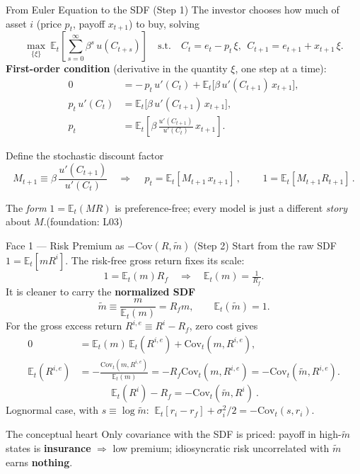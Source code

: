 \documentclass{beamer}
\newcommand{\E}{\mathbb{E}}
\newcommand{\Cov}{\mathrm{Cov}}
\begin{document}
\begin{frame}{From Euler Equation to the SDF (Step 1)}
\small
The investor chooses how much of asset $i$ (price $p_t$, payoff $x_{t+1}$) to buy, solving
\begin{equation*}
\max_{\{\xi\}}\ \E_t\!\left[\sum_{s=0}^{\infty}\beta^{s}\, u(C_{t+s})\right]
\quad\text{s.t.}\quad C_t = e_t - p_t\,\xi,\ \ C_{t+1}=e_{t+1}+x_{t+1}\,\xi .
\end{equation*}
\textbf{First-order condition} (derivative in the quantity $\xi$, one step at a time):
\begin{align*}
0 &= -\,p_t\, u'(C_t) + \E_t\!\big[\beta\, u'(C_{t+1})\, x_{t+1}\big],\\
p_t\, u'(C_t) &= \E_t\!\big[\beta\, u'(C_{t+1})\, x_{t+1}\big],\\
p_t &= \E_t\!\left[\beta\,\frac{u'(C_{t+1})}{u'(C_t)}\,x_{t+1}\right].
\end{align*}
\begin{block}{Define the stochastic discount factor}
\[
M_{t+1} \equiv \beta\,\frac{u'(C_{t+1})}{u'(C_t)}
\quad\Longrightarrow\quad
\boxed{\,p_t=\E_t[M_{t+1}\,x_{t+1}]\,},\qquad \boxed{\,1=\E_t[M_{t+1}R_{t+1}]\,}.
\]
\end{block}
\alert{The \emph{form} $1=\E_t(MR)$ is preference-free; every model is just a different \textit{story} about $M$.}\hfill {\scriptsize(foundation: L03)}
\end{frame}

\begin{frame}{Face 1 --- Risk Premium as $-\Cov(R,\widetilde m)$ (Step 2)}
\small
Start from the raw SDF $1=\E_t[mR^i]$. The risk-free gross return fixes its scale:
\[
1=\E_t(m)R_f \quad\Longrightarrow\quad \E_t(m)=\tfrac{1}{R_f}.
\]
It is cleaner to carry the \textbf{normalized SDF}
\[
\widetilde m \equiv \frac{m}{\E_t(m)}=R_f m,\qquad \E_t(\widetilde m)=1.
\]
For the gross excess return $R^{i,e}\equiv R^i-R_f$, zero cost gives
\begin{align*}
0 &= \E_t(m)\,\E_t(R^{i,e})+\Cov_t(m,R^{i,e}),\\
\E_t(R^{i,e})
&= -\frac{\Cov_t(m,R^{i,e})}{\E_t(m)}
=-R_f\Cov_t(m,R^{i,e})
=-\Cov_t(\widetilde m,R^{i,e}).
\end{align*}
\[
\boxed{\ \E_t(R^i)-R_f=-\Cov_t(\widetilde m,R^i)\ }.
\]
Lognormal case, with $s\equiv\log\widetilde m$: $\ \E_t[r_i-r_f]+\sigma_i^2/2=-\Cov_t(s,r_i).$
\begin{block}{The conceptual heart}
Only \alert{covariance with the SDF} is priced: payoff in high-$\widetilde m$ states is \textbf{insurance} $\Rightarrow$ low premium; idiosyncratic risk uncorrelated with $\widetilde m$ earns \textbf{nothing}.
\end{block}
\end{frame}
\end{document}
